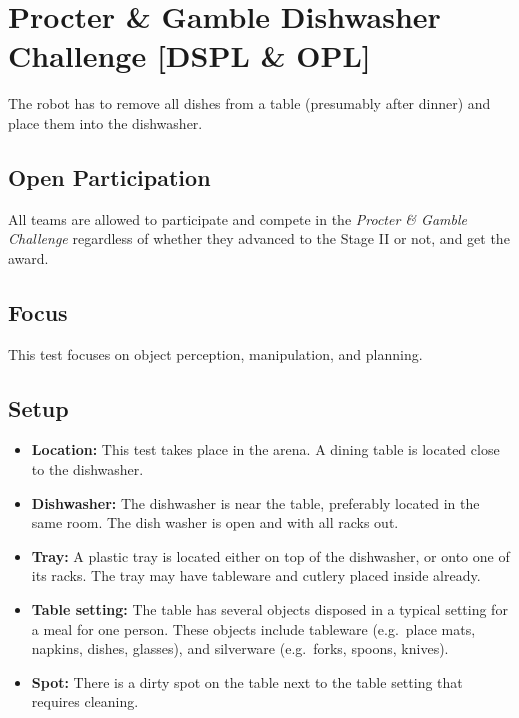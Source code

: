 \section{Procter \& Gamble Dishwasher Challenge [DSPL \& OPL]}

\newcommand{\openpart}{%
All teams are allowed to participate and compete in the \textit{Procter \& Gamble Challenge} regardless of whether they advanced to the Stage II or not, and get the award.
}

The robot has to remove all dishes from a table (presumably after dinner) and place them into the dishwasher.

\subsection{Open Participation}
\openpart

\subsection{Focus}
This test focuses on object perception, manipulation, and planning.

\subsection{Setup}
\begin{itemize}
	\item \textbf{Location:} This test takes place in the arena. A dining table is located close to the dishwasher.
	\item \textbf{Dishwasher:} The dishwasher is near the table, preferably located in the same room. The dish washer is open and with all racks out.
	\item \textbf{Tray:} A plastic tray is located either on top of the dishwasher, or onto one of its racks. The tray may have tableware and cutlery placed inside already.
	\item \textbf{Table setting:} The table has several objects disposed in a typical setting for a meal for one person. These objects include tableware (e.g.~place mats, napkins, dishes, glasses), and silverware (e.g.~forks, spoons, knives).
	\item \textbf{Spot:} There is a dirty spot on the table next to the table setting that requires cleaning.
\end{itemize}

